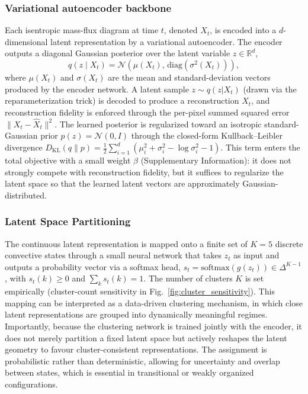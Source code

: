 \documentclass[11pt]{article}
\begin{document}
\subsubsection{Variational autoencoder backbone}

Each isentropic mass-flux diagram at time $t$, denoted $X_t$, is encoded into a $d$-dimensional latent representation by a variational autoencoder. The encoder outputs a diagonal Gaussian posterior over the latent variable $z\in\mathbb{R}^d$,
\[
q(z \mid X_t) = \mathcal{N}\!\left(\mu(X_t),\,\mathrm{diag}(\sigma^2(X_t))\right),
\]
where $\mu(X_t)$ and $\sigma(X_t)$ are the mean and standard-deviation vectors produced by the encoder network. A latent sample $z\sim q(z|X_t)$ (drawn via the reparameterization trick) is decoded to produce a reconstruction $\hat{X}_t$, and reconstruction fidelity is enforced through the per-pixel summed squared error $\|X_t-\hat{X}_t\|^2$. The learned posterior is regularized toward an isotropic standard-Gaussian prior $p(z)=\mathcal{N}(0,I)$ through the closed-form Kullback--Leibler divergence $D_{\mathrm{KL}}(q\|p) = \tfrac{1}{2}\sum_{i=1}^d\!\left(\mu_i^2+\sigma_i^2-\log\sigma_i^2-1\right)$. This term enters the total objective with a small weight $\beta$ (Supplementary Information): it does not strongly compete with reconstruction fidelity, but it suffices to regularize the latent space so that the learned latent vectors are approximately Gaussian-distributed.

\subsubsection{Latent Space Partitioning}

The continuous latent representation is mapped onto a finite set of $K=5$ discrete convective states through a small neural network that takes $z_t$ as input and outputs a probability vector via a softmax head, $s_t = \mathrm{softmax}(g(z_t)) \in \Delta^{K-1}$, with $s_t(k)\ge 0$ and $\sum_k s_t(k)=1$. The number of clusters $K$ is set empirically (cluster-count sensitivity in Fig.~\ref{fig:cluster_sensitivity}). This mapping can be interpreted as a data-driven clustering mechanism, in which close latent representations are grouped into dynamically meaningful regimes. Importantly, because the clustering network is trained jointly with the encoder, it does not merely partition a fixed latent space but actively reshapes the latent geometry to favour cluster-consistent representations. The assignment is probabilistic rather than deterministic, allowing for uncertainty and overlap between states, which is essential in transitional or weakly organized configurations.
\end{document}
